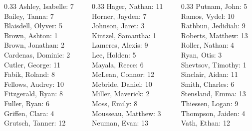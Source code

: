 \documentclass[10pt]{beamer}
\begin{document}
\begin{frame}
\begin{columns}
\begin{column}{0.33\textwidth}
Ashley, Isabelle: 7 \\ 
Bailey, Tanna: 7 \\ 
Blaisdell, Olyver: 5 \\ 
Brown, Ashton: 1 \\ 
Brown, Jonathan: 2 \\ 
Cardenas, Dominic: 2 \\ 
Cutler, George: 11 \\ 
Fabik, Roland: 8 \\ 
Fellows, Audrey: 10 \\ 
Fitzgerald, Ryan: 8 \\ 
Fuller, Ryan: 6 \\ 
Griffen, Clara: 4 \\ 
Grutsch, Tanner: 12 \\\end{column}
\begin{column}{0.33\textwidth}
Hager, Nathan: 11 \\ 
Horner, Jayden: 7 \\ 
Johnson, Jaret: 3 \\ 
Kintzel, Samantha: 1 \\ 
Lameres, Alexis: 9 \\ 
Lee, Holden: 5 \\ 
Mayala, Reece: 6 \\ 
McLean, Connor: 12 \\ 
Mcbride, Daniel: 10 \\ 
Miller, Maverick: 2 \\ 
Moss, Emily: 8 \\ 
Mousseau, Matthew: 3 \\ 
Neuman, Evan: 13 \\\end{column}
\begin{column}{0.33\textwidth}
Putnam, John: 5 \\ 
Ramos, Vydel: 10 \\ 
Rathbun, Jedidiah: 9 \\ 
Roberts, Matthew: 13 \\ 
Roller, Nathan: 4 \\ 
Ryan, Otis: 3 \\ 
Shevtsov, Timothy: 1 \\ 
Sinclair, Aidan: 11 \\ 
Smith, Charles: 6 \\ 
Stensland, Emma: 13 \\ 
Thiessen, Logan: 9 \\ 
Thompson, Jaiden: 4 \\ 
Vath, Ethan: 12 \\\end{column}
\end{columns}
\end{frame}
\end{document}
